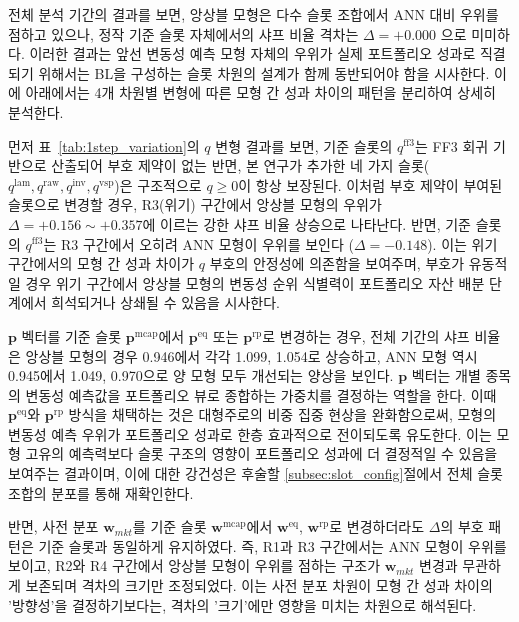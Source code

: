 \documentclass[eng]{kjas3}
\begin{document}
전체 분석 기간의 결과를 보면, 앙상블 모형은 다수 슬롯 조합에서 ANN 대비 우위를 점하고 있으나, 정작 기준 슬롯 자체에서의 샤프 비율 격차는 $\Delta = +0.000$ 으로 미미하다. 이러한 결과는 앞선 변동성 예측 모형 자체의 우위가 실제 포트폴리오 성과로 직결되기 위해서는 BL을 구성하는 슬롯 차원의 설계가 함께 동반되어야 함을 시사한다. 이에 아래에서는 4개 차원별 변형에 따른 모형 간 성과 차이의 패턴을 분리하여 상세히 분석한다.

먼저 표~\ref{tab:1step_variation}의 $q$ 변형 결과를 보면, 기준 슬롯의 $q^{\mathrm{ff3}}$는 FF3 회귀 기반으로 산출되어 부호 제약이 없는 반면, 본 연구가 추가한 네 가지 슬롯($q^{\mathrm{lam}}, q^{\mathrm{raw}}, q^{\mathrm{inv}}, q^{\mathrm{vsp}}$)은 구조적으로 $q \geq 0$이 항상 보장된다. 이처럼 부호 제약이 부여된 슬롯으로 변경할 경우, R3(위기) 구간에서 앙상블 모형의 우위가 $\Delta = +0.156 \sim +0.357$에 이르는 강한 샤프 비율 상승으로 나타난다. 반면, 기준 슬롯의 $q^{\mathrm{ff3}}$는 R3 구간에서 오히려 ANN 모형이 우위를 보인다 ($\Delta = -0.148$). 이는 위기 구간에서의 모형 간 성과 차이가 $q$ 부호의 안정성에 의존함을 보여주며, 부호가 유동적일 경우 위기 구간에서 앙상블 모형의 변동성 순위 식별력이 포트폴리오 자산 배분 단계에서 희석되거나 상쇄될 수 있음을 시사한다.

$\mathbf{p}$ 벡터를 기준 슬롯 $\mathbf{p}^{\mathrm{mcap}}$에서 $\mathbf{p}^{\mathrm{eq}}$ 또는 $\mathbf{p}^{\mathrm{rp}}$로 변경하는 경우, 전체 기간의 샤프 비율은 앙상블 모형의 경우 0.946에서 각각 1.099, 1.054로 상승하고, ANN 모형 역시 0.945에서 1.049, 0.970으로 양 모형 모두 개선되는 양상을 보인다. $\mathbf{p}$ 벡터는 개별 종목의 변동성 예측값을 포트폴리오 뷰로 종합하는 가중치를 결정하는 역할을 한다. 이때 $\mathbf{p}^{\mathrm{eq}}$와 $\mathbf{p}^{\mathrm{rp}}$ 방식을 채택하는 것은 대형주로의 비중 집중 현상을 완화함으로써, 모형의 변동성 예측 우위가 포트폴리오 성과로 한층 효과적으로 전이되도록 유도한다. 이는 모형 고유의 예측력보다 슬롯 구조의 영향이 포트폴리오 성과에 더 결정적일 수 있음을 보여주는 결과이며, 이에 대한 강건성은 후술할  \ref{subsec:slot_config}절에서 전체 슬롯 조합의 분포를 통해 재확인한다. 

반면, 사전 분포 $\mathbf{w}_{mkt}$를 기준 슬롯 $\mathbf{w}^{\mathrm{mcap}}$에서 $\mathbf{w}^{\mathrm{eq}}$, $\mathbf{w}^{\mathrm{rp}}$로 변경하더라도 $\Delta$의 부호 패턴은 기준 슬롯과 동일하게 유지하였다. 즉, R1과 R3 구간에서는 ANN 모형이 우위를 보이고, R2와 R4 구간에서 앙상블 모형이 우위를 점하는 구조가 $\mathbf{w}_{mkt}$ 변경과 무관하게 보존되며 격차의 크기만 조정되었다. 이는 사전 분포 차원이 모형 간 성과 차이의 '방향성'을 결정하기보다는, 격차의 '크기'에만 영향을 미치는 차원으로 해석된다.
\end{document}
